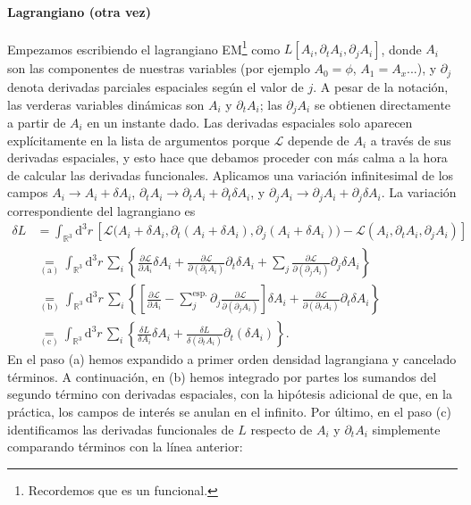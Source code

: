 \paragraph{Lagrangiano (otra vez)} Empezamos escribiendo el lagrangiano EM\footnote{Recordemos que es un funcional.} como \(L[A_i, \partial_t A_i,\partial_j A_i]\), donde \(A_i\) son las componentes de nuestras variables (por ejemplo \(A_0 = \phi\), \(A_1 = A_x\)...), y \(\partial_j\) denota derivadas parciales espaciales según el valor de \(j\). A pesar de la notación, las verderas variables dinámicas son \(A_i\) y \(\partial_t A_i\); las \(\partial_jA_i\) se obtienen directamente a partir de \(A_i\) en un instante dado. Las derivadas espaciales solo aparecen explícitamente en la lista de argumentos porque \(\mathcal{L}\) depende de \(A_i\) a través de sus derivadas espaciales, y esto hace que debamos proceder con más calma a la hora de calcular las derivadas funcionales. Aplicamos una variación infinitesimal de los campos \(A_i \rightarrow A_i + \delta A_i\), \(\partial_t A_i \rightarrow \partial_t A_i + \partial_t \delta A_i\), y \(\partial_j A_i \rightarrow \partial_j A_i + \partial_j \delta A_i\). La variación correspondiente del lagrangiano es 
\begin{align}
    \nonumber
    \delta L &= \int_{\mathbb{R}^3}\mathrm{d}^3r\, \left[\mathcal{L}\big(A_i+\delta A_i, \partial_t (A_i+\delta A_i),\partial_j (A_i+\delta A_i)\big)- \mathcal{L}(A_i,\partial_t A_i,\partial_j A_i)\right] \\\nonumber
    &\underset{(\mathrm{a})}{=} \int_{\mathbb{R}^3}\mathrm{d}^3r\, \sum_i\left\{\frac{\partial\mathcal{L}}{\partial A_i}\delta A_i +\frac{\partial \mathcal{L}}{\partial(\partial_t A_i)}\partial_t\delta A_i + \sum_{j} \frac{\partial \mathcal{L}}{\partial(\partial_j A_i)}\partial_j\delta A_i \right\}\\\nonumber
    &\underset{(\mathrm{b})}{=} \int_{\mathbb{R}^3}\mathrm{d}^3r\,\sum_i \left\{ \left[\frac{\partial\mathcal{L}}{\partial A_i} -  \sum_j^\text{esp.} \partial_j \frac{\partial \mathcal{L}}{\partial(\partial_j A_i)}\right]\delta A_i + \frac{\partial \mathcal{L}}{\partial(\partial_t A_i)}\partial_t\delta A_i \right\}\\
    \label{eq.1-L_variacion}
    &\underset{(\mathrm{c})}{=} \int_{\mathbb{R}^3}\mathrm{d}^3r\, \sum_i\left\{\frac{\delta L}{\delta A_i} \delta A_i + \frac{\delta L}{\delta (\partial_t A_i)} \partial_t(\delta A_i) \right\}.
\end{align}
En el paso (a) hemos expandido a primer orden densidad lagrangiana y cancelado términos. A continuación, en (b) hemos integrado por partes los sumandos del segundo término con derivadas espaciales, con la hipótesis adicional de que, en la práctica, los campos de interés se anulan en el infinito. Por último, en el paso (c) identificamos las derivadas funcionales de \(L\) respecto de \(A_i\) y \(\partial_t A_i\) simplemente comparando términos con la línea anterior:
